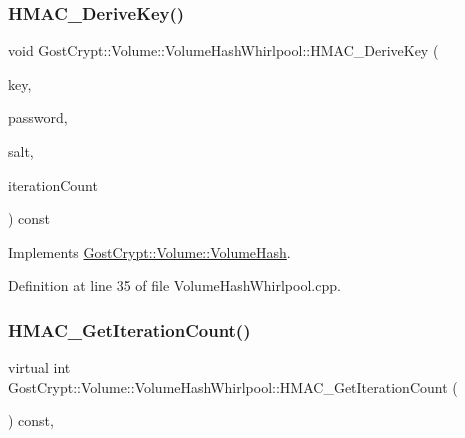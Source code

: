 \subsubsection{\texorpdfstring{H\+M\+A\+C\+\_\+\+Derive\+Key()}{HMAC\_DeriveKey()}}
{\footnotesize\ttfamily void Gost\+Crypt\+::\+Volume\+::\+Volume\+Hash\+Whirlpool\+::\+H\+M\+A\+C\+\_\+\+Derive\+Key (\begin{DoxyParamCaption}\item[{const \hyperlink{class_gost_crypt_1_1_buffer_ptr}{Buffer\+Ptr} \&}]{key,  }\item[{const \hyperlink{class_gost_crypt_1_1_volume_1_1_volume_password}{Volume\+Password} \&}]{password,  }\item[{const \hyperlink{class_gost_crypt_1_1_buffer_ptr}{Buffer\+Ptr} \&}]{salt,  }\item[{int}]{iteration\+Count }\end{DoxyParamCaption}) const\hspace{0.3cm}{\ttfamily [virtual]}}



Implements \hyperlink{class_gost_crypt_1_1_volume_1_1_volume_hash_a6804d6896491ea8c0a7be6600b6d7113}{Gost\+Crypt\+::\+Volume\+::\+Volume\+Hash}.



Definition at line 35 of file Volume\+Hash\+Whirlpool.\+cpp.

\mbox{\label{class_gost_crypt_1_1_volume_1_1_volume_hash_whirlpool_a4e7ca73f3dd4936157a6e905d33bc4a4}} 
\subsubsection{\texorpdfstring{H\+M\+A\+C\+\_\+\+Get\+Iteration\+Count()}{HMAC\_GetIterationCount()}}
{\footnotesize\ttfamily virtual int Gost\+Crypt\+::\+Volume\+::\+Volume\+Hash\+Whirlpool\+::\+H\+M\+A\+C\+\_\+\+Get\+Iteration\+Count (\begin{DoxyParamCaption}{ }\end{DoxyParamCaption}) const\hspace{0.3cm}{\ttfamily [inline]}, {\ttfamily [virtual]}}



